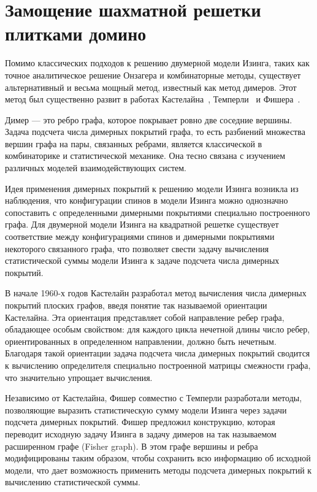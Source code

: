 \section{Замощение шахматной решетки плитками домино}

Помимо классических подходов к решению двумерной модели Изинга, таких как точное аналитическое решение Онзагера и комбинаторные методы, существует альтернативный и весьма мощный метод, известный как метод димеров. Этот метод был существенно развит в работах Кастелайна~\cite{kasteleyn1961, kasteleyn1963_1, kasteleyn1963_2}, Темперли~\cite{temperley1961} и Фишера~\cite{fisher1966}.

Димер — это ребро графа, которое покрывает ровно две соседние вершины. Задача подсчета числа димерных покрытий графа, то есть разбиений множества вершин графа на пары, связанных ребрами, является классической в комбинаторике и статистической механике. Она тесно связана с изучением различных моделей взаимодействующих систем.

Идея применения димерных покрытий к решению модели Изинга возникла из наблюдения, что конфигурации спинов в модели Изинга можно однозначно сопоставить с определенными димерными покрытиями специально построенного графа. Для двумерной модели Изинга на квадратной решетке существует соответствие между конфигурациями спинов и димерными покрытиями некоторого связанного графа, что позволяет свести задачу вычисления статистической суммы модели Изинга к задаче подсчета числа димерных покрытий.

В начале 1960-х годов Кастелайн разработал метод вычисления числа димерных покрытий плоских графов, введя понятие так называемой ориентации Кастелайна. Эта ориентация представляет собой направление ребер графа, обладающее особым свойством: для каждого цикла нечетной длины число ребер, ориентированных в определенном направлении, должно быть нечетным. Благодаря такой ориентации задача подсчета числа димерных покрытий сводится к вычислению определителя специально построенной матрицы смежности графа, что значительно упрощает вычисления.

Независимо от Кастелайна, Фишер совместно с Темперли разработали методы, позволяющие выразить статистическую сумму модели Изинга через задачи подсчета димерных покрытий. Фишер предложил конструкцию, которая переводит исходную задачу Изинга в задачу димеров на так называемом расширенном графе (Fisher graph). В этом графе вершины и ребра модифицированы таким образом, чтобы сохранить всю информацию об исходной модели, что дает возможность применить методы подсчета димерных покрытий к вычислению статистической суммы.

